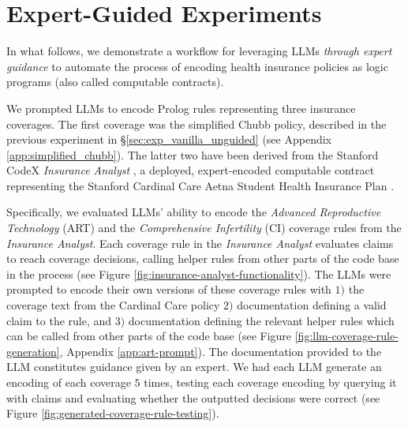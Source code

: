 \raggedbottom
\section{Expert-Guided Experiments}



\label{sec:expert-informed}
In what follows, we demonstrate a workflow for leveraging LLMs \emph{through expert guidance} to automate the process of encoding health insurance policies as logic programs (also called computable contracts). 


 We prompted LLMs to encode Prolog rules representing three insurance coverages. The first coverage was the simplified Chubb policy, described in the previous experiment in \S\ref{sec:exp_vanilla_unguided} (see Appendix \ref{app:simplified_chubb}). The latter two have been derived from the Stanford CodeX \textit{Insurance Analyst} \cite{insurance-analyst-2025}, a deployed, expert-encoded computable contract representing the Stanford Cardinal Care Aetna Student Health Insurance Plan \cite{aetna2024} \cite{goodenough2023}. 
 
 Specifically, we evaluated LLMs' ability to encode the \textit{Advanced Reproductive Technology} (ART) and the \textit{Comprehensive Infertility} (CI) coverage rules from the \textit{Insurance Analyst}. Each coverage rule in the \textit{Insurance Analyst} evaluates claims to reach coverage decisions, calling helper rules from other parts of the code base in the process (see Figure \ref{fig:insurance-analyst-functionality}). The LLMs were prompted to encode their own versions of these coverage rules with $1)$ the coverage text from the Cardinal Care policy $2)$ documentation defining a valid claim to the rule, and $3)$ documentation defining the relevant helper rules which can be called from other parts of the code base (see Figure \ref{fig:llm-coverage-rule-generation}, Appendix \ref{app:art-prompt}). The documentation provided to the LLM constitutes guidance given by an expert. We had each LLM generate an encoding of each coverage $5$ times, testing each coverage encoding by querying it with claims and evaluating whether the outputted decisions were correct (see Figure \ref{fig:generated-coverage-rule-testing}).

